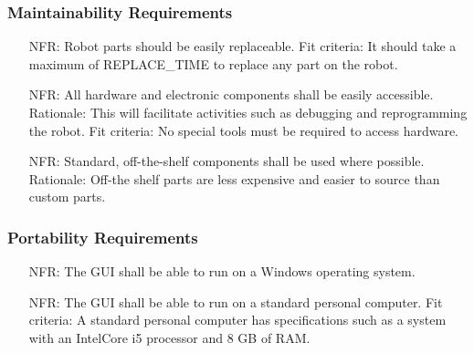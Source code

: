 \documentclass[12pt]{article}
\newcounter{nfrnum} %
\begin{document}
\subsubsection{Maintainability Requirements}

\noindent \begin{itemize}
\item[NFR\refstepcounter{nfrnum}\thenfrnum \label{NFR_Maintainability1}:] Robot parts should be easily replaceable. 
\newline Fit criteria: It should take a maximum of REPLACE\_TIME to replace any part on the robot.
\item[NFR\refstepcounter{nfrnum}\thenfrnum \label{NFR_Maintainability2}:] All hardware and electronic components shall be easily accessible.  
\newline Rationale: This will facilitate activities such as debugging and reprogramming the robot. 
\newline Fit criteria: No special tools must be required to access hardware.
\item[NFR\refstepcounter{nfrnum}\thenfrnum \label{NFR_Maintainability3}:] Standard, off-the-shelf components shall be used where possible.
\newline Rationale: Off-the shelf parts are less expensive and easier to source than custom parts.
\end{itemize}

\subsubsection{Portability Requirements}

\noindent \begin{itemize}
\item[NFR\refstepcounter{nfrnum}\thenfrnum \label{NFR_Portability1}:] The GUI shall be able to run on a Windows operating system.
\item[NFR\refstepcounter{nfrnum}\thenfrnum \label{NFR_Portability2}:] The GUI shall be able to run on a standard personal computer. 
\newline Fit criteria: A standard personal computer has specifications such as a system with an IntelCore i5 processor and 8 GB of RAM.
\end{itemize}
\end{document}
